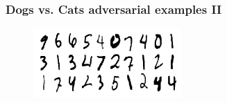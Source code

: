 \documentclass[handout]{beamer}
\begin{document}
\begin{frame}
\frametitle{Dogs vs. Cats adversarial examples II} 
\begin{figure}
\includegraphics[width=0.9\linewidth]{./pictures/MNIST.png}
\end{figure}
\end{frame}



%
%
\end{document}
